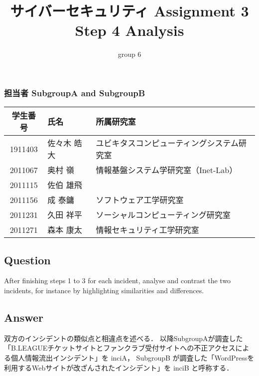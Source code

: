 \documentclass[uplatex]{jsarticle}
\title{
    \vspace{-1.5cm}
    サイバーセキュリティ Assignment 3 \\
    Step 4 Analysis
}
\author{group 6}
\begin{document}
\maketitle

\subsubsection*{担当者 SubgroupA and SubgroupB}
\begin{table}[H]
    \begin{tabular}{|c|l|l|}
        \hline
        学生番号 & 氏名 & 所属研究室\\
        \hline\hline
        1911403 & 佐々木 皓大 & ユビキタスコンピューティングシステム研究室\\
        \hline
        2011067 & 奥村 嶺 & 情報基盤システム学研究室（Inet-Lab）\\
        \hline
        2011115 & 佐伯 雄飛 & \\
        \hline
        2011156 & 成 泰鏞 & ソフトウェア工学研究室\\
        \hline
        2011231 & 久田 祥平 & ソーシャルコンピューティング研究室\\
        \hline
        2011271 & 森本 康太 & 情報セキュリティ工学研究室\\
        \hline
    \end{tabular}
\end{table}

\subsection*{Question}
After finishing steps 1 to 3 for each incident,
analyse and contrast the two incidents,
for instance by highlighting similarities and differences.
\subsection*{Answer}
双方のインシデントの類似点と相違点を述べる．
以降SubgroupAが調査した「B.LEAGUEチケットサイトとファンクラブ受付サイトへの不正アクセスによる個人情報流出インシデント」を inciA，
SubgroupB が調査した「WordPressを利用するWebサイトが改ざんされたインシデント」を inciB
と呼称する．
\end{document}
